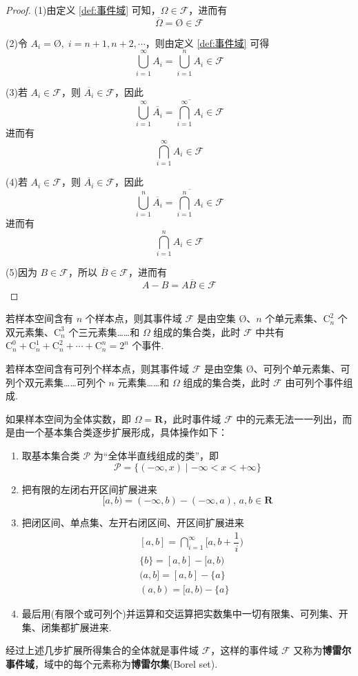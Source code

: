\begin{proof}
    (1)由定义 \ref{def:事件域} 可知，$\varOmega \in \mathcal{F}$，进而有
    $$
    \overline{\varOmega} = \text{\O} \in \mathcal{F}
    $$

    (2)令 $A_{i} = \text{\O},\; i = n+1, n+2, \cdots$，则由定义 \ref{def:事件域} 可得
    $$
    \bigcup_{i=1}^{\infty} A_i = \bigcup_{i=1}^{n} A_i \in \mathcal{F}
    $$

    (3)若 $A_i \in \mathcal{F}$，则 $\overline{A_i} \in \mathcal{F}$，因此
    $$
    \bigcup_{i=1}^{\infty} \overline{A_i} = \overline{\bigcap_{i=1}^{\infty} A_i} \in \mathcal{F}
    $$
    进而有
    $$
    \bigcap_{i=1}^{\infty} A_i \in \mathcal{F}
    $$

    (4)若 $A_i \in \mathcal{F}$，则 $\overline{A_i} \in \mathcal{F}$，因此
    $$
    \bigcup_{i=1}^{n} \overline{A_i} = \overline{\bigcap_{i=1}^{n} A_i} \in \mathcal{F}
    $$
    进而有
    $$
    \bigcap_{i=1}^{n} A_i \in \mathcal{F}
    $$

    (5)因为 $B \in \mathcal{F}$，所以 $\overline{B} \in \mathcal{F}$，进而有
    $$
    A-B = A \overline{B} \in \mathcal{F}
    $$
\end{proof}

若样本空间含有 $n$ 个样本点，则其事件域 $\mathcal{F}$ 是由空集 $\text{\O}$、$n$ 个单元素集、$\mathrm{C}_n^2$ 个双元素集、$\mathrm{C}_n^3$ 个三元素集……和 $\varOmega$ 组成的集合类，此时 $\mathcal{F}$ 中共有 $\mathrm{C}_n^0 + \mathrm{C}_n^1 + \mathrm{C}_n^2 + \cdots + \mathrm{C}_n^n = 2^n$ 个事件.

若样本空间含有可列个样本点，则其事件域 $\mathcal{F}$ 是由空集 $\text{\O}$、可列个单元素集、可列个双元素集……可列个 $n$ 元素集……和 $\varOmega$ 组成的集合类，此时 $\mathcal{F}$ 由可列个事件组成.

如果样本空间为全体实数，即 $\varOmega = \mathbf{R}$，此时事件域 $\mathcal{F}$ 中的元素无法一一列出，而是由一个基本集合类逐步扩展形成，具体操作如下：
\begin{enumerate}
    \item 取基本集合类 $\mathcal{P}$ 为“全体半直线组成的类”，即
    $$
    \mathcal{P} = \{ (-\infty, x) \mid -\infty < x < +\infty \}
    $$
    \item 把有限的左闭右开区间扩展进来
    $$
    [a,b) = (-\infty,b) - (-\infty,a), \, a,b \in \mathbf{R}
    $$
    \item 把闭区间、单点集、左开右闭区间、开区间扩展进来
    $$
    \begin{aligned}
        & [a,b] = \bigcap_{i=1}^{\infty} \Big[ a, b + \dfrac{1}{i} \Big) \\
        & \{ b \} = [a,b] - [a,b) \\
        & (a,b] = [a,b] - \{ a \} \\
        & (a,b) = [a,b) - \{ a \}
    \end{aligned}
    $$
    \item 最后用(有限个或可列个)并运算和交运算把实数集中一切有限集、可列集、开集、闭集都扩展进来.
\end{enumerate}
经过上述几步扩展所得集合的全体就是事件域 $\mathcal{F}$，这样的事件域 $\mathcal{F}$ 又称为\textbf{博雷尔事件域}，域中的每个元素称为\textbf{博雷尔集}(Borel set).

